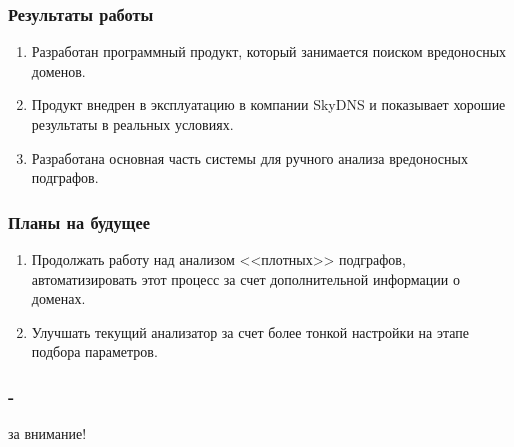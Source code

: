 \documentclass[12pt,pdf,hyperref={unicode}]{beamer}
\begin{document}
\begin{frame}
\frametitle{Результаты работы}
\begin{enumerate}
	\item Разработан программный продукт, который занимается поиском вредоносных доменов.
	\item Продукт внедрен в эксплуатацию в компании SkyDNS и показывает хорошие результаты в реальных условиях.
	\item Разработана основная часть системы для ручного анализа вредоносных подграфов.
\end{enumerate}
\end{frame}

\begin{frame}
\frametitle{Планы на будущее}
\begin{enumerate}
	\item Продолжать работу над анализом <<плотных>> подграфов, автоматизировать этот процесс за счет дополнительной информации о доменах.
	\item Улучшать текущий анализатор за счет более тонкой настройки на этапе подбора параметров.
	
\end{enumerate}
\end{frame}


\begin{frame}
\frametitle{-}
\Large{} за внимание!
\end{frame}
\end{document}
